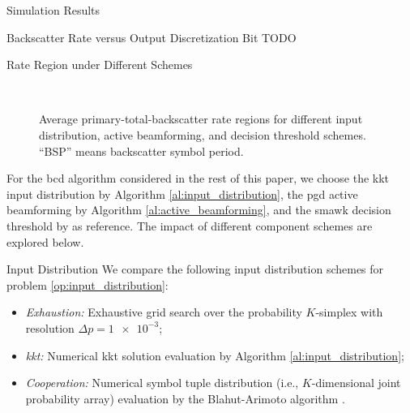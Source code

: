 \documentclass[journal]{IEEEtran}
\begin{document}
\begin{section}{Simulation Results}
\begin{subsection}{Backscatter Rate versus Output Discretization Bit}
		TODO


	\end{subsection}

	\begin{subsection}{Rate Region under Different Schemes}
		\begin{figure}[!t]
			\centering
			\\
			\caption{
				Average primary-total-backscatter rate regions for different input distribution, active beamforming, and decision threshold schemes.
				``BSP'' means backscatter symbol period.
			}
		\end{figure}
		For the \gls{bcd} algorithm considered in the rest of this paper, we choose the \gls{kkt} input distribution by Algorithm \ref{al:input_distribution}, the \gls{pgd} active beamforming by Algorithm \ref{al:active_beamforming}, and the \gls{smawk} decision threshold by \cite{He2021} as reference.
		The impact of different component schemes are explored below.

		\begin{subsubsection}{Input Distribution}
			We compare the following input distribution schemes for problem \eqref{op:input_distribution}:
			\begin{itemize}
				\item \emph{Exhaustion:} Exhaustive grid search over the probability $K$-simplex with resolution $\Delta p = \num{1e-3}$;
				\item \emph{\gls{kkt}:} Numerical \gls{kkt} solution evaluation by Algorithm \ref{al:input_distribution};
				\item \emph{Cooperation:} Numerical symbol tuple distribution (i.e., $K$-dimensional joint probability array) evaluation by the Blahut-Arimoto algorithm \cite{Arimoto1972,Blahut1972a}.
			\end{itemize}


\end{subsubsection}
\end{subsection}
\end{section}
\end{document}
